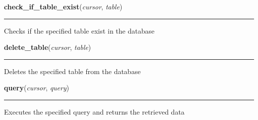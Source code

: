     \vspace{0.5ex}

\hspace{.8\funcindent}\begin{boxedminipage}{\funcwidth}

    \raggedright \textbf{check\_if\_table\_exist}(\textit{cursor}, \textit{table})

    \vspace{-1.5ex}

    \rule{\textwidth}{0.5\fboxrule}
\setlength{\parskip}{2ex}
    Checks if the specified table exist in the database

\setlength{\parskip}{1ex}
    \end{boxedminipage}

    \label{BilbasenDataMining:database:delete_table}

    \vspace{0.5ex}

\hspace{.8\funcindent}\begin{boxedminipage}{\funcwidth}

    \raggedright \textbf{delete\_table}(\textit{cursor}, \textit{table})

    \vspace{-1.5ex}

    \rule{\textwidth}{0.5\fboxrule}
\setlength{\parskip}{2ex}
    Deletes the specified table from the database

\setlength{\parskip}{1ex}
    \end{boxedminipage}

    \label{BilbasenDataMining:database:query}

    \vspace{0.5ex}

\hspace{.8\funcindent}\begin{boxedminipage}{\funcwidth}

    \raggedright \textbf{query}(\textit{cursor}, \textit{query})

    \vspace{-1.5ex}

    \rule{\textwidth}{0.5\fboxrule}
\setlength{\parskip}{2ex}
    Executes the specified query and returns the retrieved data

\setlength{\parskip}{1ex}
    \end{boxedminipage}

